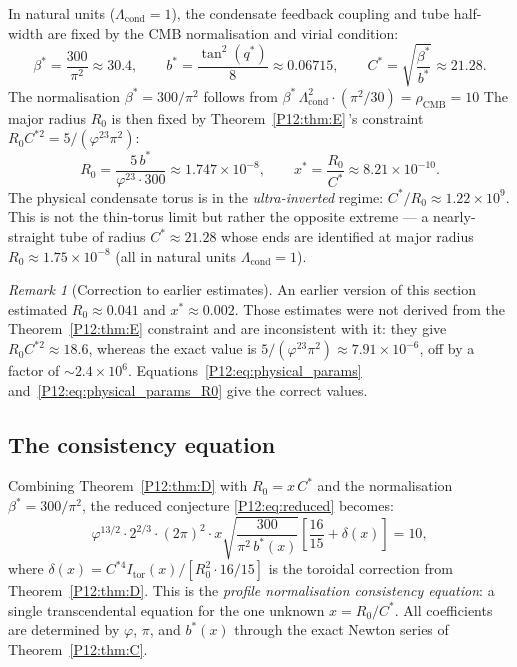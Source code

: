 \documentclass[11pt,a4paper]{article}
\theoremstyle{definition}
\theoremstyle{remark}
\newtheorem{remark}[theorem]{Remark}
\newcommand{\vp}{\varphi}
\newcommand{\bst}{\beta^{*}}
\newcommand{\Lcond}{\Lambda_{\mathrm{cond}}}
\newcommand{\rCMB}{\rho_{\mathrm{CMB}}}
\begin{document}
In natural units ($\Lcond=1$), the condensate feedback coupling and
tube half-width are fixed by the CMB normalisation and virial condition:
\begin{equation}
  \bst = \frac{300}{\pi^2} \approx 30.4,
  \qquad
  b^* = \frac{\tan^2(q^*)}{8} \approx 0.06715,
  \qquad
  C^* = \sqrt{\frac{\bst}{b^*}} \approx 21.28.
  \label{P12:eq:physical_params}
\end{equation}
The normalisation $\bst=300/\pi^2$ follows from
$\bst\,\Lcond^2\cdot(\pi^2/30)=\rCMB=10$
The major radius $R_0$ is then fixed by Theorem~\ref{P12:thm:E}\,'s
constraint $R_0 C^{*2}=5/(\vp^{23}\pi^2)$:
\begin{equation}
  R_0 = \frac{5\,b^*}{\vp^{23}\cdot 300} \approx 1.747\times10^{-8},
  \qquad
  x^* = \frac{R_0}{C^*} \approx 8.21\times10^{-10}.
  \label{P12:eq:physical_params_R0}
\end{equation}
The physical condensate torus is in the \emph{ultra-inverted} regime:
$C^*/R_0\approx1.22\times10^9$. This is not the thin-torus limit
but rather the opposite extreme --- a nearly-straight tube of radius
$C^*\approx21.28$ whose ends are identified at major radius
$R_0\approx1.75\times10^{-8}$ (all in natural units $\Lcond=1$).
\begin{remark}[Correction to earlier estimates]
\label{P12:rem:phys_correction}
An earlier version of this section estimated $R_0\approx0.041$ and
$x^*\approx0.002$. Those estimates were not derived from
the Theorem~\ref{P12:thm:E} constraint and are inconsistent with it:
they give $R_0 C^{*2}\approx18.6$, whereas the exact value is
$5/(\vp^{23}\pi^2)\approx7.91\times10^{-6}$, off by a factor
of $\sim2.4\times10^6$. Equations~\eqref{P12:eq:physical_params}
and~\eqref{P12:eq:physical_params_R0} give the correct values.
\end{remark}

\subsection{The consistency equation}

Combining Theorem~\ref{P12:thm:D} with $R_0=x\,C^*$
and the normalisation $\bst=300/\pi^2$, the reduced conjecture
\eqref{P12:eq:reduced} becomes:
\begin{equation}
  \boxed{
  \vp^{13/2}\cdot2^{2/3}\cdot(2\pi)^2\cdot x
  \sqrt{\frac{300}{\pi^2\,b^*(x)}}
  \left[\frac{16}{15}+\delta(x)\right]
  = 10,}
  \label{P12:eq:consistency}
\end{equation}
where $\delta(x)=C^{*4}I_{\mathrm{tor}}(x)/[R_0^2\cdot16/15]$
is the toroidal correction from Theorem~\ref{P12:thm:D}.
This is the \emph{profile normalisation consistency equation}:
a single transcendental equation for the one unknown $x=R_0/C^*$.
All coefficients are determined by $\vp$, $\pi$, and $b^*(x)$
through the exact Newton series of Theorem~\ref{P12:thm:C}.
\end{document}
